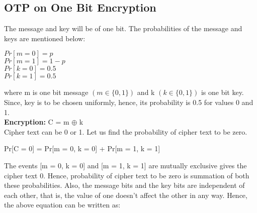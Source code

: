 \documentclass[11pt]{article}
\begin{document}
\subsection{OTP on One Bit Encryption}
The message and key will be of one bit. The probabilities of the message and keys are mentioned below:
\begin{center}
    $Pr[m = 0] = p$\\
    $Pr[m = 1] = 1 - p$\\
    $Pr[k = 0] = 0.5$\\
    $Pr[k = 1] = 0.5$\\
\end{center}
where m is one bit message $(m \in \{0, 1\})$ and k $(k \in \{0, 1\})$ is one bit key.
Since, key is to be chosen uniformly, hence, its probability is 0.5 for values 0 and 1.\\
\textbf{Encryption: } C = m $\oplus$ k\\
\newline
Cipher text can be 0 or 1. Let us find the probability of cipher text to be zero.
\begin{center}
    Pr[C = 0] = Pr[m = 0, k = 0] + Pr[m = 1, k = 1]
\end{center}
The events [m = 0, k = 0] and [m = 1, k = 1] are mutually exclusive gives the cipher text 0. Hence, probability of cipher text to be zero is summation of both these probabilities. Also, the message bits and the key bits are independent of each other, that is, the value of one doesn't affect the other in any way. Hence, the above equation can be written as:
\end{document}
